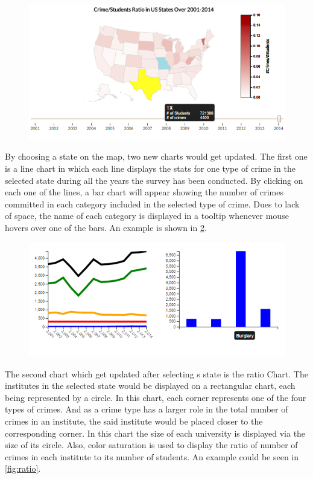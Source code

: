 \documentclass[12pt]{article}
\begin{document}
\begin{figure}[H]
   \centering{}
	       \includegraphics[width=5in]{map.PNG}           
\caption{}
\label{fig:map}
\end{figure}



By choosing a state on the map, two new charts would get updated. The first one is a line chart in which each line displays the stats for one type of crime in the selected state during all the years the survey has been conducted. By clicking on each one of the lines, a bar chart will appear showing the number of crimes committed in each category included in the selected type of crime. Dues to lack of space, the name of each category is displayed in a tooltip whenever mouse hovers over one of the bars. An example is shown in \cref{fig:charts}.
\begin{figure}[H]
   \centering{}
	       \includegraphics[width=5in]{chart.PNG}           
\caption{}
\label{fig:charts}
\end{figure}

The second chart which get updated after selecting s state is the ratio Chart. The institutes in the selected state would be displayed on a rectangular chart, each being represented by a circle. In this chart, each corner represents one of the four types of crimes. And as a crime type has a larger role in the total number of crimes in an institute, the said institute would be placed closer to the corresponding corner. In this chart the size of each university is displayed via the size of its circle. Also, color saturation is used to display the ratio of number of crimes in each institute to its number of students. An example could be seen in \cref{fig:ratio}.
\end{document}
